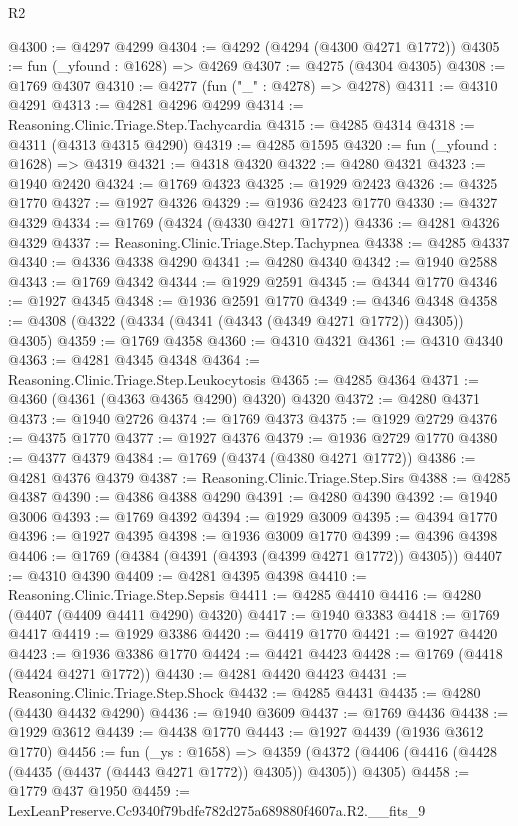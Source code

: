 \begin{lexlean}{R2}
\begin{coremodule}
@4300 := @4297 @4299
@4304 := @4292 (@4294 (@4300 @4271 @1772))
@4305 := fun (_yfound : @1628) => @4269
@4307 := @4275 (@4304 @4305)
@4308 := @1769 @4307
@4310 := @4277 (fun ("_" : @4278) => @4278)
@4311 := @4310 @4291
@4313 := @4281 @4296 @4299
@4314 := Reasoning.Clinic.Triage.Step.Tachycardia
@4315 := @4285 @4314
@4318 := @4311 (@4313 @4315 @4290)
@4319 := @4285 @1595
@4320 := fun (_yfound : @1628) => @4319
@4321 := @4318 @4320
@4322 := @4280 @4321
@4323 := @1940 @2420
@4324 := @1769 @4323
@4325 := @1929 @2423
@4326 := @4325 @1770
@4327 := @1927 @4326
@4329 := @1936 @2423 @1770
@4330 := @4327 @4329
@4334 := @1769 (@4324 (@4330 @4271 @1772))
@4336 := @4281 @4326 @4329
@4337 := Reasoning.Clinic.Triage.Step.Tachypnea
@4338 := @4285 @4337
@4340 := @4336 @4338 @4290
@4341 := @4280 @4340
@4342 := @1940 @2588
@4343 := @1769 @4342
@4344 := @1929 @2591
@4345 := @4344 @1770
@4346 := @1927 @4345
@4348 := @1936 @2591 @1770
@4349 := @4346 @4348
@4358 := @4308 (@4322 (@4334 (@4341 (@4343 (@4349 @4271 @1772)) @4305)) @4305)
@4359 := @1769 @4358
@4360 := @4310 @4321
@4361 := @4310 @4340
@4363 := @4281 @4345 @4348
@4364 := Reasoning.Clinic.Triage.Step.Leukocytosis
@4365 := @4285 @4364
@4371 := @4360 (@4361 (@4363 @4365 @4290) @4320) @4320
@4372 := @4280 @4371
@4373 := @1940 @2726
@4374 := @1769 @4373
@4375 := @1929 @2729
@4376 := @4375 @1770
@4377 := @1927 @4376
@4379 := @1936 @2729 @1770
@4380 := @4377 @4379
@4384 := @1769 (@4374 (@4380 @4271 @1772))
@4386 := @4281 @4376 @4379
@4387 := Reasoning.Clinic.Triage.Step.Sirs
@4388 := @4285 @4387
@4390 := @4386 @4388 @4290
@4391 := @4280 @4390
@4392 := @1940 @3006
@4393 := @1769 @4392
@4394 := @1929 @3009
@4395 := @4394 @1770
@4396 := @1927 @4395
@4398 := @1936 @3009 @1770
@4399 := @4396 @4398
@4406 := @1769 (@4384 (@4391 (@4393 (@4399 @4271 @1772)) @4305))
@4407 := @4310 @4390
@4409 := @4281 @4395 @4398
@4410 := Reasoning.Clinic.Triage.Step.Sepsis
@4411 := @4285 @4410
@4416 := @4280 (@4407 (@4409 @4411 @4290) @4320)
@4417 := @1940 @3383
@4418 := @1769 @4417
@4419 := @1929 @3386
@4420 := @4419 @1770
@4421 := @1927 @4420
@4423 := @1936 @3386 @1770
@4424 := @4421 @4423
@4428 := @1769 (@4418 (@4424 @4271 @1772))
@4430 := @4281 @4420 @4423
@4431 := Reasoning.Clinic.Triage.Step.Shock
@4432 := @4285 @4431
@4435 := @4280 (@4430 @4432 @4290)
@4436 := @1940 @3609
@4437 := @1769 @4436
@4438 := @1929 @3612
@4439 := @4438 @1770
@4443 := @1927 @4439 (@1936 @3612 @1770)
@4456 := fun (_ys : @1658) =>
  @4359 (@4372 (@4406 (@4416 (@4428 (@4435 (@4437 (@4443 @4271 @1772)) @4305)) @4305)) @4305)
@4458 := @1779 @437 @1950
@4459 := LexLeanPreserve.Cc9340f79bdfe782d275a689880f4607a.R2.__fits_9

\end{coremodule}
\end{lexlean}
